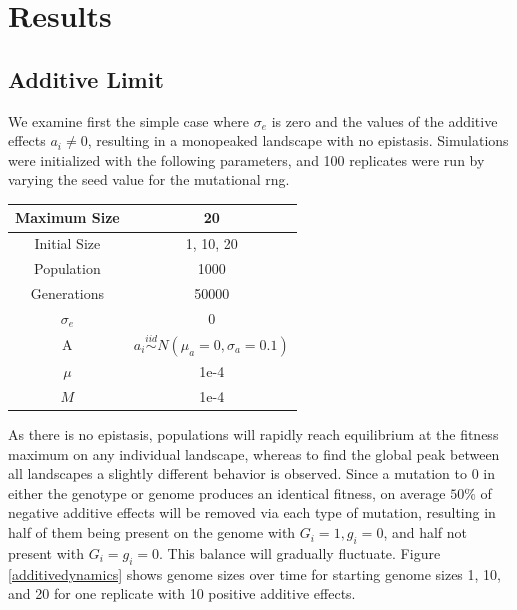 \documentclass[paper=a4, fontsize=11pt,twoside]{scrartcl}       %
\begin{document}
\section*{Results}

\subsection*{Additive Limit}

We examine first the simple case where $\sigma_{e}$ is zero and the values of the additive effects $a_i \neq 0$, resulting in a monopeaked landscape with no epistasis. Simulations were initialized with the following parameters, and 100 replicates were run by varying the seed value for the mutational rng.

\begin{center}
    \begin{tabular}{ | c | c | }
	\hline
	Maximum Size & 20 \\ \hline
	Initial Size & 1, 10, 20 \\ \hline
	Population & 1000 \\ \hline
	Generations & 50000 \\ \hline
	$\sigma_e$ & 0 \\ \hline
	A & $a_i \overset{iid}{\sim} N(\mu_a = 0, \sigma_a = 0.1)$ \\ \hline
	$\mu$  & 1e-4 \\ \hline
	$M$ & 1e-4 \\ \hline
    \end{tabular}
\end{center}

As there is no epistasis, populations will rapidly reach equilibrium at the fitness maximum on any individual landscape, whereas to find the global peak between all landscapes a slightly different behavior is observed. Since a mutation to $0$ in either the genotype or genome produces an identical fitness, on average $50\%$ of negative additive effects will be removed via each type of mutation, resulting in half of them being present on the genome with $G_i = 1, g_i = 0$, and half not present with $G_i = g_i = 0$. This balance will gradually fluctuate. Figure \ref{additivedynamics} shows genome sizes over time for starting genome sizes 1, 10, and 20 for one replicate with 10 positive additive effects. 
\end{document}
